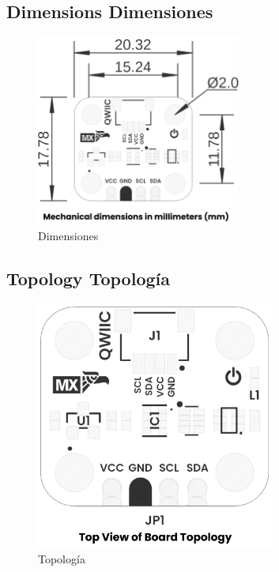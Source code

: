 \documentclass[11pt,a4paper]{article}
\begin{document}
\subsection{Dimensions Dimensiones}


\begin{figure}[H]
\centering
\includegraphics[width=0.6\textwidth]{es_unit_dimension_v_1_0_0_icp10111_barometric_pressure_sensor.png}
\caption{Dimensiones}
\label{fig:es-unit-dimension-v-1-0-0-icp10111-barometric-pressure-sensor-png}
\end{figure}



\subsection{Topology Topología}


\begin{figure}[H]
\centering
\includegraphics[width=0.7\textwidth]{es_unit_topology_v_1_0_0_icp10111_barometric_pressure_sensor.png}
\caption{Topología}
\label{fig:es-unit-topology-v-1-0-0-icp10111-barometric-pressure-sensor-png}
\end{figure}
\end{document}
